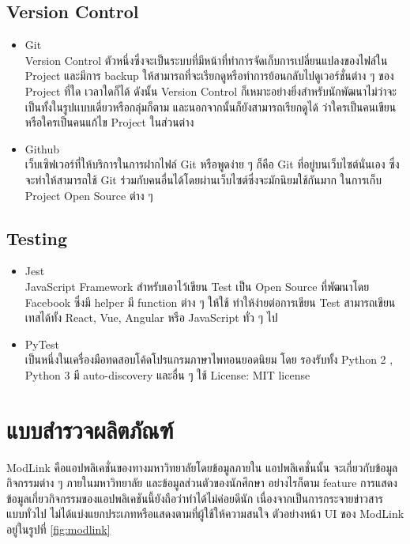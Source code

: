 \documentclass[14pt,oneside,openright,a4paper]{cpe-thai-project}
\begin{document}
  \subsection{Version Control}
    \begin{itemize}
      \item Git \cite{Git} \\
        Version Control ตัวหนึ่งซึ่งจะเป็นระบบที่มีหน้าที่ทำการจัดเก็บการเปลี่ยนแปลงของไฟล์ใน Project และมีการ backup ให้สามารถที่จะเรียกดูหรือทำการย้อนกลับไปดูเวอร์ชั่นต่าง ๆ ของ Project ที่ใด เวลาใดก็ได้ ดังนั้น Version Control ก็เหมาะอย่างยิ่งสำหรับนักพัฒนาไม่ว่าจะเป็นทั้งในรูปเเบบเดี่ยวหรือกลุ่มก็ตาม และนอกจากนั้นก็ยังสามารถเรียกดูได้ ว่าใครเป็นคนเขียนหรือใครเป็นคนแก้ไข Project ในส่วนต่าง
      \item Github \\
        เว็บเซิฟเวอร์ที่ให้บริการในการฝากไฟล์ Git หรือพูดง่าย ๆ ก็คือ Git ที่อยู่บนเว็บไซต์นั่นเอง ซึ่งจะทำให้สามารถใช้ Git ร่วมกับคนอื่นได้โดยผ่านเว็บไซต์ซึ่งจะมักนิยมใช้กันมาก ในการเก็บ Project Open Source ต่าง ๆ
    \end{itemize}

  \subsection{Testing}
    \begin{itemize}
      \item Jest \cite{Jest}\\
        JavaScript Framework สำหรับเอาไว้เขียน Test เป็น Open Source ที่พัฒนาโดย Facebook ซึ่งมี helper มี function ต่าง ๆ ให้ใช้ ทำให้ง่ายต่อการเขียน Test สามารถเขียนเทสได้ทั้ง React, Vue, Angular หรือ JavaScript ทั่ว ๆ ไป
      \item PyTest \\
        เป็นหนึ่งในเครื่องมือทดสอบโค้ดโปรแกรมภาษาไพทอนยอดนิยม โดย รองรับทั้ง Python 2 , Python 3 มี auto-discovery และอื่น ๆ 
        ใช้ License: MIT license
    \end{itemize}

\section{แบบสำรวจผลิตภัณฑ์}
  ModLink คือแอปพลิเคชั่นของทางมหาวิทยาลัยโดยข้อมูลภายใน แอปพลิเคชั่นนั้น จะเกี่ยวกับข้อมูลกิจกรรมต่าง ๆ ภายในมหาวิทยาลัย และข้อมูลส่วนตัวของนักศึกษา อย่างไรก็ตาม feature การแสดงข้อมูลเกี่ยวกิจกรรมของแอปพลิเคชันนี้ยังถือว่าทำได้ไม่ค่อยดีนัก เนื่องจากเป็นการกระจายข่าวสาร แบบทั่วไป ไม่ได้แบ่งแยกประเภทหรือแสดงตามที่ผู้ใช้ให้ความสนใจ ตัวอย่างหน้า UI ของ ModLink อยู่ในรูปที่ \ref{fig:modlink}
\end{document}
